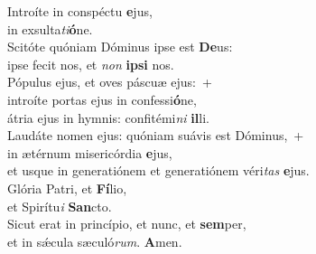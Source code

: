 \evenverse Introíte in conspéctu \textbf{e}jus,~\*\\
\evenverse in exsulta\textit{ti}\textbf{ó}ne.\\
\oddverse Scitóte quóniam Dóminus ipse est \textbf{De}us:~\*\\
\oddverse ipse fecit nos, et \textit{non} \textbf{i}\textbf{psi} nos.\\
\evenverse Pópulus ejus, et oves páscuæ ejus:~+\\
\evenverse  introíte portas ejus in confessi\textbf{ó}ne,~\*\\
\evenverse átria ejus in hymnis: confitémi\textit{ni} \textbf{il}li.\\
\oddverse Laudáte nomen ejus: quóniam suávis est Dóminus,~+\\
\oddverse  in ætérnum misericórdia \textbf{e}jus,~\*\\
\oddverse et usque in generatiónem et generatiónem véri\textit{tas} \textbf{e}jus.\\
\evenverse Glória Patri, et \textbf{Fí}lio,~\*\\
\evenverse et Spirítu\textit{i} \textbf{San}cto.\\
\oddverse Sicut erat in princípio, et nunc, et \textbf{sem}per,~\*\\
\oddverse et in sǽcula sæculó\textit{rum}. \textbf{A}men.\\
